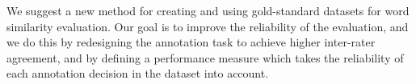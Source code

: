 We suggest a new method for creating and using gold-standard datasets for word similarity evaluation. Our goal is to improve the reliability of the evaluation, and we do this by redesigning the annotation task to achieve higher inter-rater agreement, and by defining a performance measure which takes the reliability of each annotation decision in the dataset into account.
